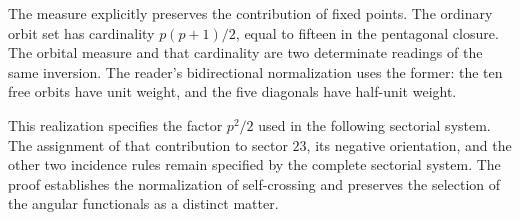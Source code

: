 The measure explicitly preserves the contribution of fixed points.
The ordinary orbit set has cardinality $p(p+1)/2$, equal to
fifteen in the pentagonal closure. The orbital measure and that cardinality
are two determinate readings of the same inversion. The reader's
bidirectional normalization uses the former: the ten free orbits
have unit weight, and the five diagonals have half-unit weight.

This realization specifies the factor $p^2/2$ used in the following
sectorial system. The assignment of that contribution to sector $23$,
its negative orientation, and the other two incidence rules remain
specified by the complete sectorial system. The proof establishes the
normalization of self-crossing and preserves the selection of the
angular functionals as a distinct matter.
